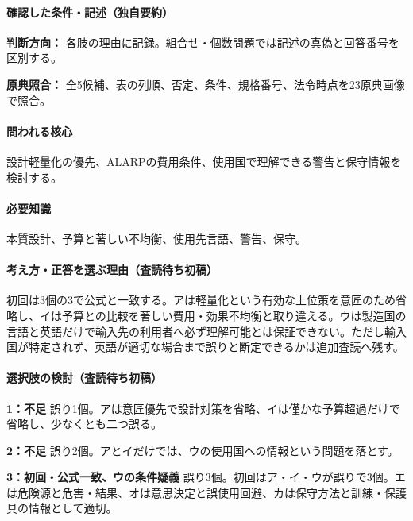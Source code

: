 \paragraph{確認した条件・記述（独自要約）}\mbox{}\par

\noindent\textbf{判断方向：} 各肢の理由に記録。組合せ・個数問題では記述の真偽と回答番号を区別する。\par

\noindent\textbf{原典照合：} 全5候補、表の列順、否定、条件、規格番号、法令時点を23原典画像で照合。\par

\paragraph{問われる核心} 設計軽量化の優先、ALARPの費用条件、使用国で理解できる警告と保守情報を検討する。

\paragraph{必要知識} 本質設計、予算と著しい不均衡、使用先言語、警告、保守。

\paragraph{考え方・正答を選ぶ理由（査読待ち初稿）} 初回は3個の3で公式と一致する。アは軽量化という有効な上位策を意匠のため省略し、イは予算との比較を著しい費用・効果不均衡と取り違える。ウは製造国の言語と英語だけで輸入先の利用者へ必ず理解可能とは保証できない。ただし輸入国が特定されず、英語が適切な場合まで誤りと断定できるかは追加査読へ残す。

\paragraph{選択肢の検討（査読待ち初稿）}\mbox{}\par

\noindent\textbf{1：不足} 誤り1個。アは意匠優先で設計対策を省略、イは僅かな予算超過だけで省略し、少なくとも二つ誤る。\par

\noindent\textbf{2：不足} 誤り2個。アとイだけでは、ウの使用国への情報という問題を落とす。\par

\noindent\textbf{3：初回・公式一致、ウの条件疑義} 誤り3個。初回はア・イ・ウが誤りで3個。エは危険源と危害・結果、オは意思決定と誤使用回避、カは保守方法と訓練・保護具の情報として適切。\par

